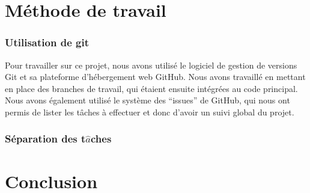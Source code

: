 \documentclass[12pt]{article}
\begin{document}
\newpage

\part{Méthode de travail}
\section{Utilisation de git}
Pour travailler sur ce projet, nous avons utilisé le logiciel de gestion de versions Git et sa plateforme d’hébergement web GitHub. Nous avons travaillé en mettant en place des branches de travail, qui étaient ensuite intégrées au code principal. Nous avons également utilisé le système des “issues” de GitHub, qui nous ont permis de lister les tâches à effectuer et donc d’avoir un suivi global du projet.

\section{Séparation des t$\hat a$ches}


\part{Conclusion}
		
\end{document}
